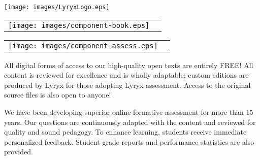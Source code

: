 \setlength{\parskip}{0pt}
\thispagestyle{empty}


\vspace{-3em}
\begin{center}
	\texttt{[image: images/LyryxLogo.eps]}

	\vspace{2em}
	\textcolor{lscstextcolour}{\textbf{\fontsize{24}{28}\selectfont {Champions of Access to Knowledge}}}
\end{center}

\vfill

\setlength{\columnsep}{4em}

\begin{multicols}{2}
\begin{center}
\begin{lscshdrbox}
\begin{tabu}{X[1,c,m] X[2,l,m]}
\vspace{0pt}
\texttt{[image: images/component-book.eps]}
&
\vspace{0pt}
\textcolor{white}{\textbf{\fontsize{14}{20}\selectfont {OPEN TEXT}}}
\end{tabu}
\end{lscshdrbox}
\end{center}

\columnbreak

\begin{center}
\begin{lscshdrbox}
\begin{tabu}{X[1,c,m] X[2,l,m]}
\vspace{0pt}
\texttt{[image: images/component-assess.eps]}
&
\vspace{0pt}
\textcolor{white}{\textbf{\fontsize{14}{20}\selectfont {ONLINE ASSESSMENT}}}
\end{tabu}
\end{lscshdrbox}
\end{center}
\end{multicols}


\begin{multicols}{2}
\parbox{1.0\linewidth}{
All digital forms of access to our high-quality open texts are entirely FREE! All content is reviewed for excellence and is wholly adaptable; custom editions are produced by Lyryx for those adopting Lyryx assessment. Access to the original source files is also open to anyone! 
}

\columnbreak

\parbox{1.0\linewidth}{
We have been developing superior online formative assessment for more than 15 years. Our questions are continuously adapted with the content and reviewed for quality and sound pedagogy. To enhance learning, students receive immediate personalized feedback. Student grade reports and performance statistics are also provided.
	}
\end{multicols}

